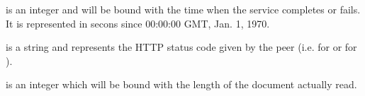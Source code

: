 \documentclass{ozdoc}
\begin{document}
\begin{mozartDESCRIPTION}
 is an integer and will be bound with the time when the service completes or fails. It is represented in secons since 00:00:00 GMT, Jan. 1, 1970.   

 is a string and represents the HTTP status code given by the peer (i.e.  for  or  for ).  

 is an integer which will be bound with the length of the document actually read. \mozartEMPTY
\end{mozartDESCRIPTION}


\label{SECTION.HTTPCLIENT.SERVICE}
\end{document}
